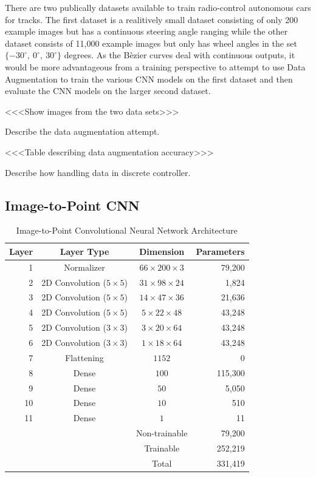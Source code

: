 \documentclass[conference]{IEEEtran}
\begin{document}
There are two publically datasets available to train radio-control autonomous cars for tracks. The first dataset is a realitively small dataset consisting of only 200 example images but has a continuous steering angle ranging \cite{tian2019} while the other dataset consists of 11,000 example images but only has wheel angles in the set $\lbrace -30^\circ,\ 0^\circ,\ 30^\circ \rbrace$ degrees. As the B\`ezier curves deal with continuous outputs, it would be more advantageous from a training perspective to attempt to use Data Augmentation to train the various CNN models on the first dataset and then evaluate the CNN models on the larger second dataset.



<<<Show images from the two data sets>>>

Describe the data augmentation attempt.

<<<Table describing data augmentation accuracy>>>

Describe how handling data in discrete controller.



\subsection{Image-to-Point CNN}

\begin{table}[htbp]
	\centering
	\caption{Image-to-Point Convolutional Neural Network Architecture}
	\begin{tabular}{|r|c|c|r|}
	\multicolumn{1}{c}{\bfseries Layer} & \multicolumn{1}{c}{\bfseries Layer Type} & \multicolumn{1}{c}{\bfseries Dimension} & \multicolumn{1}{c}{\bfseries Parameters} \\ \hline
	1 & Normalizer & $66 \times 200 \times 3$ & 79,200 \\
	2 & 2D Convolution ($5\times5$)& $31 \times 98 \times 24$ & 1,824 \\
	3 & 2D Convolution ($5\times5$)& $14 \times 47 \times 36$ & 21,636 \\
	4 & 2D Convolution ($5\times5$)& $5 \times 22 \times 48$ & 43,248 \\
	5 & 2D Convolution ($3\times3$)& $3 \times 20 \times 64$ & 43,248 \\
	6 & 2D Convolution ($3\times3$)& $1 \times 18 \times 64$ & 43,248 \\
	7 & Flattening & $1152$ & 0 \\
	8 & Dense & $100$ & 115,300 \\
	9 & Dense & $50$ & 5,050 \\
	10 & Dense & $10$ & 510 \\
	11 & Dense & $1$ & 11 \\ \hline
	\multicolumn{2}{c|}{} & Non-trainable & 79,200 \\
	\multicolumn{2}{c|}{} & Trainable & 252,219 \\ \cline{3-4}
	\multicolumn{2}{c|}{} & Total & 331,419 \\ \cline{3-4}
	\end{tabular}
\end{table}
\end{document}
